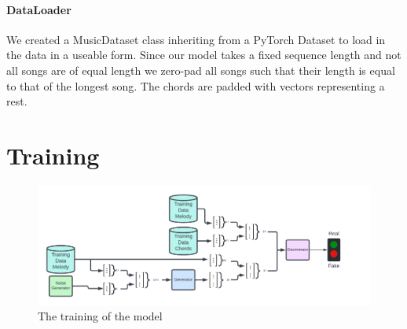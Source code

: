 \paragraph{DataLoader} 
We created a MusicDataset class inheriting from a PyTorch Dataset to load in the data in a useable form.
Since our model takes a fixed sequence length and not all songs are of equal length we zero-pad all songs such that their length is equal to that of the longest song.
The chords are padded with vectors representing a rest.

\section{Training}

\begin{figure}
    \centering
    \includegraphics[width=0.8\columnwidth]{Figures/GAN}
    \decoRule
    \caption{The training of the model}
    \label{fig:ModelTraining}
\end{figure}

